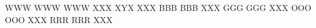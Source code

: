 \RubikFaceUp WWW WWW WWW
\RubikFaceDown XXX XYX XXX
\RubikFaceLeft BBB BBB XXX
\RubikFaceRight GGG GGG XXX
\RubikFaceFront OOO OOO XXX
\RubikFaceBack RRR RRR XXX